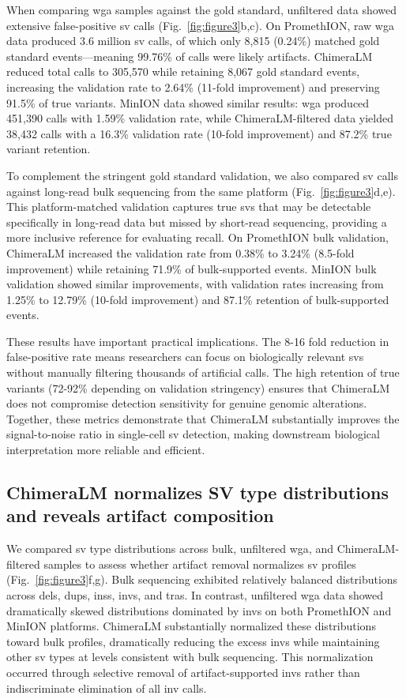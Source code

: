 \documentclass[pdflatex,sn-nature,lineno]{sn-jnl}%
\theoremstyle{thmstyleone}%
\theoremstyle{thmstyletwo}%
\theoremstyle{thmstylethree}%
\begin{document}
When comparing \gls{wga} samples against the gold standard, unfiltered data showed extensive false-positive \gls{sv} calls (Fig.~\ref{fig:figure3}b,c).
On PromethION, raw \gls{wga} data produced 3.6 million \gls{sv} calls, of which only 8,815 (0.24\%) matched gold standard events—meaning 99.76\% of calls were likely artifacts.
ChimeraLM reduced total calls to 305,570 while retaining 8,067 gold standard events, increasing the validation rate to 2.64\% (11-fold improvement) and preserving 91.5\% of true variants.
MinION data showed similar results: \gls{wga} produced 451,390 calls with 1.59\% validation rate, while ChimeraLM-filtered data yielded 38,432 calls with a 16.3\% validation rate (10-fold improvement) and 87.2\% true variant retention.

To complement the stringent gold standard validation, we also compared \gls{sv} calls against long-read bulk sequencing from the same platform (Fig.~\ref{fig:figure3}d,e).
This platform-matched validation captures true \glspl{sv} that may be detectable specifically in long-read data but missed by short-read sequencing, providing a more inclusive reference for evaluating recall.
On PromethION bulk validation, ChimeraLM increased the validation rate from 0.38\% to 3.24\% (8.5-fold improvement) while retaining 71.9\% of bulk-supported events.
MinION bulk validation showed similar improvements, with validation rates increasing from 1.25\% to 12.79\% (10-fold improvement) and 87.1\% retention of bulk-supported events.

These results have important practical implications.
The 8-16 fold reduction in false-positive rate means researchers can focus on biologically relevant \glspl{sv} without manually filtering thousands of artificial calls.
The high retention of true variants (72-92\% depending on validation stringency) ensures that ChimeraLM does not compromise detection sensitivity for genuine genomic alterations.
Together, these metrics demonstrate that ChimeraLM substantially improves the signal-to-noise ratio in single-cell \gls{sv} detection, making downstream biological interpretation more reliable and efficient.

\subsection*{ChimeraLM normalizes SV type distributions and reveals artifact composition}

We compared \gls{sv} type distributions across bulk, unfiltered \gls{wga}, and ChimeraLM-filtered samples to assess whether artifact removal normalizes \gls{sv} profiles (Fig.~\ref{fig:figure3}f,g).
Bulk sequencing exhibited relatively balanced distributions across \glspl{del}, \glspl{dup}, \glspl{ins}, \glspl{inv}, and \glspl{tra}.
In contrast, unfiltered \gls{wga} data showed dramatically skewed distributions dominated by \glspl{inv} on both PromethION and MinION platforms.
ChimeraLM substantially normalized these distributions toward bulk profiles, dramatically reducing the excess \glspl{inv} while maintaining other \gls{sv} types at levels consistent with bulk sequencing.
This normalization occurred through selective removal of artifact-supported \glspl{inv} rather than indiscriminate elimination of all \gls{inv} calls.
\end{document}
